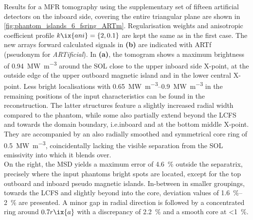                 Results for a MFR tomography using the supplementary set of fifteen artificial detectors on the inboard side, covering the entire triangular plane are shown in \cref{fig:phantom_islands_6_fsring_ARTm}. Regularisation weights and anisotropic coefficient profile $k\ix{ani}=\left\{2, 0.1\right\}$ are kept the same as in the first case. The new arrays forward calculated signals in \textbf{(b)} are indicated with ARTf (pseudonym for \textit{ARTificial}). In \textbf{(a)}, the tomogram shows a maximum brightness of \SI{0.94}{\mega\watt\per\cubic\meter} around the SOL close to the upper inboard side X-point, at the outside edge of the upper outboard magnetic island and in the lower central X-point. Less bright localisations with \SIrange{0.65}{0.9}{\mega\watt\per\cubic\meter} in the remaining positions of the input characteristics can be found in the reconstruction. The latter structures feature a slightly increased radial width compared to the phantom, while some also partially extend beyond the LCFS and towards the domain boundary, i.e.inboard and at the bottom middle X-point. They are accompanied by an also radially smoothed and symmetrical core ring of \SI{0.5}{\mega\watt\per\cubic\meter}, coincidentally lacking the visible separation from the SOL emissivity into which it blends over.\\%
                On the right, the MSD yields a maximum error of \SI{4.6}{\percent} outside the separatrix, precisely where the input phantoms bright spots are located, except for the top outboard and inboard pseudo magnetic islands. In-between in smaller groupings, towards the LCFS and slightly beyond into the core, deviation values of \SIrange{1.6}{2}{\percent} are presented. A minor gap in radial direction is followed by a concentrated ring around $0.7r\ix{a}$ with a discrepancy of \SI{2.2}{\percent} and a smooth core at <\SI{1}{\percent}.\\%
